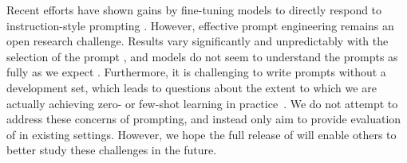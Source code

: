 Recent efforts have shown gains by fine-tuning models to directly respond to instruction-style prompting \cite{flan2021,min2021metaicl,sanh2021multitask,ouyang2022training}. However, effective prompt engineering remains an open research challenge. Results vary significantly and unpredictably with the selection of the prompt  \cite{promptsensitivity2021}, and models do not seem to understand the prompts as fully as we expect \cite{webson2021prompt}. Furthermore, it is challenging to write prompts without a development set, which leads to questions about the extent to which we are actually achieving zero- or few-shot learning in practice~\cite{perez2021true}. We do not attempt to address these concerns of prompting, and instead only aim to provide evaluation of \OPT{} in existing settings. However, we hope the full release of \OPT{} will enable others to better study these challenges in the future. 